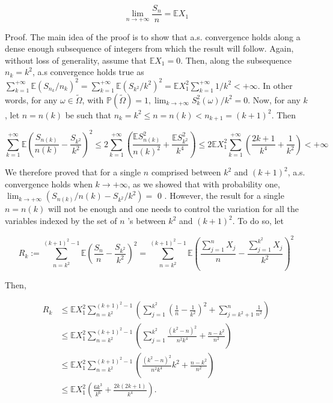 \documentclass[11pt]{amsbook}
\theoremstyle{plain}%
\theoremstyle{definition}
\theoremstyle{remark}
\begin{document}
$$
\lim _{n \rightarrow+\infty} \frac{S_{n}}{n}=\mathbb{E} X_{1}
$$

Proof. The main idea of the proof is to show that a.s. convergence holds along a dense enough subsequence of integers from which the result will follow. Again, without loss of generality, assume that $\mathbb{E} X_{1}=0$. Then, along the subsequence $n_{k}=k^{2}$, a.s convergence holds true as $\sum_{k=1}^{+\infty} \mathbb{E}\left(S_{n_{k}} / n_{k}\right)^{2}=\sum_{k=1}^{+\infty} \mathbb{E}\left(S_{k^{2}} / k^{2}\right)^{2}=\mathbb{E} X_{1}^{2} \sum_{k=1}^{+\infty} 1 / k^{2}<+\infty$. In other words, for any $\omega \in \widetilde{\Omega}$, with $\mathbb{P}(\widetilde{\Omega})=1, \lim _{k \rightarrow+\infty} S_{k}^{2}(\omega) / k^{2}=0$. Now, for any $k$, let $n=n(k)$ be such that $n_{k}=k^{2} \leq n=n(k)<n_{k+1}=(k+1)^{2}$. Then

$$
\sum_{k=1}^{+\infty} \mathbb{E}\left(\frac{S_{n(k)}}{n(k)}-\frac{S_{k^{2}}}{k^{2}}\right)^{2} \leq 2 \sum_{k=1}^{+\infty}\left(\frac{\mathbb{E} S_{n(k)}^{2}}{n(k)^{2}}+\frac{\mathbb{E} S_{k^{2}}^{2}}{k^{4}}\right) \leq 2 \mathbb{E} X_{1}^{2} \sum_{k=1}^{+\infty}\left(\frac{2 k+1}{k^{4}}+\frac{1}{k^{2}}\right)<+\infty
$$

We therefore proved that for a single $n$ comprised between $k^{2}$ and $(k+1)^{2}$, a.s. convergence holds when $k \rightarrow+\infty$, as we showed that with probability one, $\lim _{k \rightarrow+\infty}\left(S_{n(k)} / n(k)-S_{k^{2}} / k^{2}\right)=$ 0 . However, the result for a single $n=n(k)$ will not be enough and one needs to control the variation for all the variables indexed by the set of $n$ 's between $k^{2}$ and $(k+1)^{2}$. To do so, let

$$
R_{k}:=\sum_{n=k^{2}}^{(k+1)^{2}-1} \mathbb{E}\left(\frac{S_{n}}{n}-\frac{S_{k^{2}}}{k^{2}}\right)^{2}=\sum_{n=k^{2}}^{(k+1)^{2}-1} \mathbb{E}\left(\frac{\sum_{j=1}^{n} X_{j}}{n}-\frac{\sum_{j=1}^{k^{2}} X_{j}}{k^{2}}\right)^{2}
$$

Then,

$$
\begin{aligned}
R_{k} & \leq \mathbb{E} X_{1}^{2} \sum_{n=k^{2}}^{(k+1)^{2}-1}\left(\sum_{j=1}^{k^{2}}\left(\frac{1}{n}-\frac{1}{k^{2}}\right)^{2}+\sum_{j=k^{2}+1}^{n} \frac{1}{n^{2}}\right) \\
& \leq \mathbb{E} X_{1}^{2} \sum_{n=k^{2}}^{(k+1)^{2}-1}\left(\sum_{j=1}^{k^{2}} \frac{\left(k^{2}-n\right)^{2}}{n^{2} k^{4}}+\frac{n-k^{2}}{n^{2}}\right) \\
& \leq \mathbb{E} X_{1}^{2} \sum_{n=k^{2}}^{(k+1)^{2}-1}\left(\frac{\left(k^{2}-n\right)^{2}}{n^{2} k^{4}} k^{2}+\frac{n-k^{2}}{n^{2}}\right) \\
& \leq \mathbb{E} X_{1}^{2}\left(\frac{6 k^{3}}{k^{6}}+\frac{2 k(2 k+1)}{k^{4}}\right) .
\end{aligned}
$$
\end{document}
